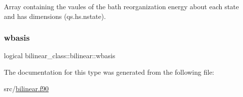 Array containing the vaules of the bath reorganization energy about each state and has dimensions (qs.\+hs.\+nstate). 

\mbox{\label{structbilinear__class_1_1bilinear_a78eec2ff8a3e1de38eb02ceeb108ad15}} 
\subsubsection{\texorpdfstring{wbasis}{wbasis}}
{\footnotesize\ttfamily logical bilinear\+\_\+class\+::bilinear\+::wbasis\hspace{0.3cm}{\ttfamily [private]}}



The documentation for this type was generated from the following file\+:\begin{DoxyCompactItemize}
\item 
src/\hyperlink{bilinear_8f90}{bilinear.\+f90}\end{DoxyCompactItemize}
